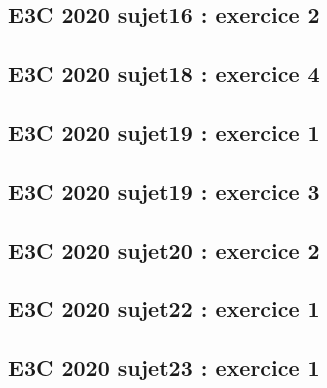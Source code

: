 \documentclass[lang=fr,edition=teacher,layout=sheet]{mxbook}
\begin{document}
\begingroup\endgroup
\par\bigskip
{}\subsection*{E3C 2020 sujet16 : exercice 2}
\begingroup\endgroup
\par\bigskip
{}\subsection*{E3C 2020 sujet18 : exercice 4}
\begingroup\endgroup
\par\bigskip
{}\subsection*{E3C 2020 sujet19 : exercice 1}
\begingroup\endgroup
\par\bigskip
{}\subsection*{E3C 2020 sujet19 : exercice 3}
\begingroup\endgroup
\par\bigskip
{}\subsection*{E3C 2020 sujet20 : exercice 2}
\begingroup\endgroup
\par\bigskip
{}\subsection*{E3C 2020 sujet22 : exercice 1}
\begingroup\endgroup
\par\bigskip
{}\subsection*{E3C 2020 sujet23 : exercice 1}
\begingroup\endgroup
\end{document}
